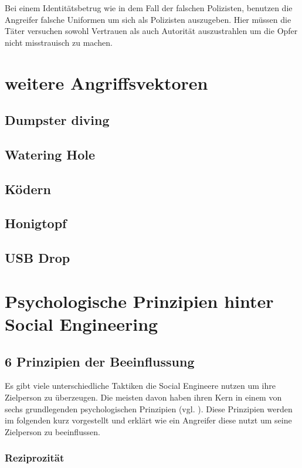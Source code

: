 Bei einem Identitätsbetrug wie in dem Fall der falschen Polizisten, benutzen die Angreifer falsche Uniformen um sich als Polizisten auszugeben. Hier müssen die Täter versuchen sowohl Vertrauen als auch Autorität auszustrahlen um die Opfer nicht misstrauisch zu machen. 

\section{weitere Angriffsvektoren}

\subsection{Dumpster diving}
\subsection{Watering Hole}
\subsection{Ködern}
\subsection{Honigtopf}
\subsection{USB Drop}



\section{Psychologische Prinzipien hinter Social Engineering}


\subsection{6 Prinzipien der Beeinflussung}
Es gibt viele unterschiedliche Taktiken die Social Engineere nutzen um ihre Zielperson zu überzeugen. Die meisten davon haben ihren Kern in einem von sechs grundlegenden psychologischen Prinzipien (vgl. \cite{PsychDesÜberzeugens}). Diese Prinzipien werden im folgenden kurz vorgestellt und erklärt wie ein Angreifer diese nutzt um seine Zielperson zu beeinflussen.  

\subsubsection{Reziprozität}

